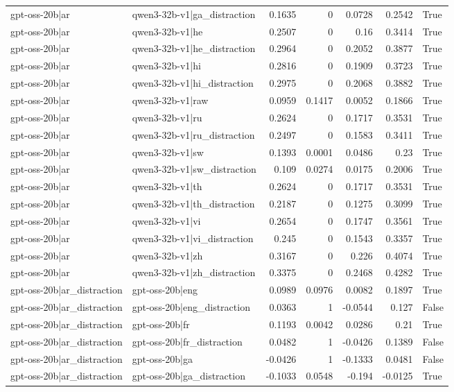\begin{table}
\begin{tabular}{l l r r r r l}
gpt-oss-20b|ar & qwen3-32b-v1|ga_distraction & 0.1635 & 0 & 0.0728 & 0.2542 & True \\
gpt-oss-20b|ar & qwen3-32b-v1|he & 0.2507 & 0 & 0.16 & 0.3414 & True \\
gpt-oss-20b|ar & qwen3-32b-v1|he_distraction & 0.2964 & 0 & 0.2052 & 0.3877 & True \\
gpt-oss-20b|ar & qwen3-32b-v1|hi & 0.2816 & 0 & 0.1909 & 0.3723 & True \\
gpt-oss-20b|ar & qwen3-32b-v1|hi_distraction & 0.2975 & 0 & 0.2068 & 0.3882 & True \\
gpt-oss-20b|ar & qwen3-32b-v1|raw & 0.0959 & 0.1417 & 0.0052 & 0.1866 & True \\
gpt-oss-20b|ar & qwen3-32b-v1|ru & 0.2624 & 0 & 0.1717 & 0.3531 & True \\
gpt-oss-20b|ar & qwen3-32b-v1|ru_distraction & 0.2497 & 0 & 0.1583 & 0.3411 & True \\
gpt-oss-20b|ar & qwen3-32b-v1|sw & 0.1393 & 0.0001 & 0.0486 & 0.23 & True \\
gpt-oss-20b|ar & qwen3-32b-v1|sw_distraction & 0.109 & 0.0274 & 0.0175 & 0.2006 & True \\
gpt-oss-20b|ar & qwen3-32b-v1|th & 0.2624 & 0 & 0.1717 & 0.3531 & True \\
gpt-oss-20b|ar & qwen3-32b-v1|th_distraction & 0.2187 & 0 & 0.1275 & 0.3099 & True \\
gpt-oss-20b|ar & qwen3-32b-v1|vi & 0.2654 & 0 & 0.1747 & 0.3561 & True \\
gpt-oss-20b|ar & qwen3-32b-v1|vi_distraction & 0.245 & 0 & 0.1543 & 0.3357 & True \\
gpt-oss-20b|ar & qwen3-32b-v1|zh & 0.3167 & 0 & 0.226 & 0.4074 & True \\
gpt-oss-20b|ar & qwen3-32b-v1|zh_distraction & 0.3375 & 0 & 0.2468 & 0.4282 & True \\
gpt-oss-20b|ar_distraction & gpt-oss-20b|eng & 0.0989 & 0.0976 & 0.0082 & 0.1897 & True \\
gpt-oss-20b|ar_distraction & gpt-oss-20b|eng_distraction & 0.0363 & 1 & -0.0544 & 0.127 & False \\
gpt-oss-20b|ar_distraction & gpt-oss-20b|fr & 0.1193 & 0.0042 & 0.0286 & 0.21 & True \\
gpt-oss-20b|ar_distraction & gpt-oss-20b|fr_distraction & 0.0482 & 1 & -0.0426 & 0.1389 & False \\
gpt-oss-20b|ar_distraction & gpt-oss-20b|ga & -0.0426 & 1 & -0.1333 & 0.0481 & False \\
gpt-oss-20b|ar_distraction & gpt-oss-20b|ga_distraction & -0.1033 & 0.0548 & -0.194 & -0.0125 & True \\

\end{tabular}
\end{table}
